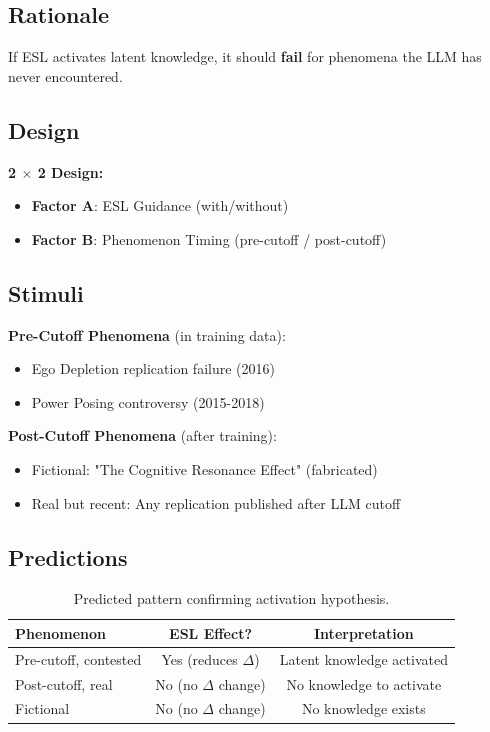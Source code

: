 \documentclass[11pt,a4paper]{article}
\begin{document}
\subsection{Rationale}

If ESL activates latent knowledge, it should \textbf{fail} for phenomena the LLM has never encountered.

\subsection{Design}

\textbf{2 $\times$ 2 Design:}
\begin{itemize}
    \item \textbf{Factor A}: ESL Guidance (with/without)
    \item \textbf{Factor B}: Phenomenon Timing (pre-cutoff / post-cutoff)
\end{itemize}

\subsection{Stimuli}

\textbf{Pre-Cutoff Phenomena} (in training data):
\begin{itemize}
    \item Ego Depletion replication failure (2016)
    \item Power Posing controversy (2015-2018)
\end{itemize}

\textbf{Post-Cutoff Phenomena} (after training):
\begin{itemize}
    \item Fictional: "The Cognitive Resonance Effect" (fabricated)
    \item Real but recent: Any replication published after LLM cutoff
\end{itemize}

\subsection{Predictions}

\begin{table}[h]
\centering
\begin{tabular}{lcc}
\toprule
\textbf{Phenomenon} & \textbf{ESL Effect?} & \textbf{Interpretation} \\
\midrule
Pre-cutoff, contested & Yes (reduces $\Delta$) & Latent knowledge activated \\
Post-cutoff, real & No (no $\Delta$ change) & No knowledge to activate \\
Fictional & No (no $\Delta$ change) & No knowledge exists \\
\bottomrule
\end{tabular}
\caption{Predicted pattern confirming activation hypothesis.}
\end{table}
\end{document}
